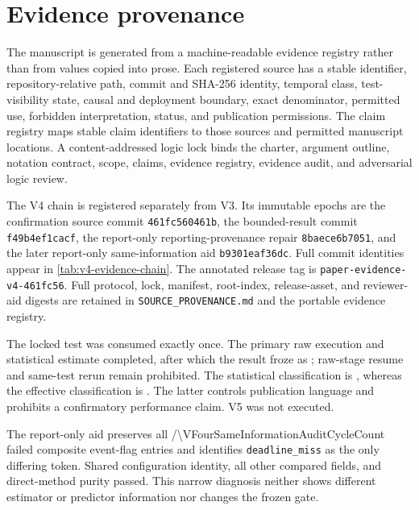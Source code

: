\section{Evidence provenance}
\label{app:provenance}

The manuscript is generated from a machine-readable evidence registry rather
than from values copied into prose.  Each registered source has a stable
identifier, repository-relative path, commit and SHA-256 identity, temporal
class, test-visibility state, causal and deployment boundary, exact
denominator, permitted use, forbidden interpretation, status, and publication
permissions.  The claim registry maps stable claim identifiers to those
sources and permitted manuscript locations.  A content-addressed logic lock
binds the charter, argument outline, notation contract, scope, claims,
evidence registry, evidence audit, and adversarial logic review.

The V4 chain is registered separately from V3.  Its immutable epochs are the
confirmation source commit
\texttt{461fc560461b}, the bounded-result commit
\texttt{f49b4ef1cacf}, the report-only
reporting-provenance repair
\texttt{8baece6b7051}, and the later report-only
same-information aid
\texttt{b9301eaf36dc}.  Full commit identities appear in
\cref{tab:v4-evidence-chain}.  The annotated release tag is
\texttt{paper-evidence-v4-461fc56}.  Full protocol, lock, manifest, root-index,
release-asset, and reviewer-aid digests are retained in
\texttt{SOURCE\_PROVENANCE.md} and the portable evidence registry.

The locked test was consumed exactly once.  The primary raw execution and
statistical estimate completed, after which the result froze as
\texttt{\VFourProtocolStatus}; raw-stage resume and same-test rerun remain
prohibited.  The statistical classification is
\texttt{\VFourStatisticalClassification}, whereas the effective
classification is \texttt{\VFourEffectiveClassification}.  The latter
controls publication language and prohibits a confirmatory performance claim.
V5 was not executed.

The report-only aid preserves all
\VFourSameInformationFailureCount/\num{\VFourSameInformationAuditCycleCount}{}
failed composite event-flag entries and identifies
\texttt{deadline\_miss} as the only differing token.  Shared configuration
identity, all other compared fields, and direct-method purity passed.  This
narrow diagnosis neither shows different estimator or predictor information
nor changes the frozen gate.


